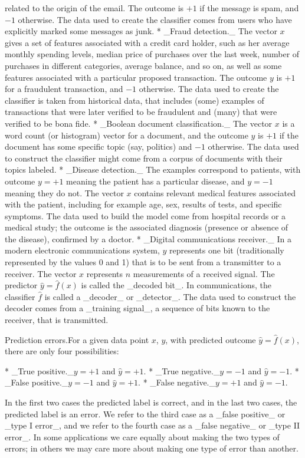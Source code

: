 related to the origin of the email. The outcome is \(+1\) if the message is spam, and \(-1\) otherwise. The data used to create the classifier comes from users who have explicitly marked some messages as junk.
* _Fraud detection._ The vector \(x\) gives a set of features associated with a credit card holder, such as her average monthly spending levels, median price of purchases over the last week, number of purchases in different categories, average balance, and so on, as well as some features associated with a particular proposed transaction. The outcome \(y\) is \(+1\) for a fraudulent transaction, and \(-1\) otherwise. The data used to create the classifier is taken from historical data, that includes (some) examples of transactions that were later verified to be fraudulent and (many) that were verified to be bona fide.
* _Boolean document classification._ The vector \(x\) is a word count (or histogram) vector for a document, and the outcome \(y\) is \(+1\) if the document has some specific topic (say, politics) and \(-1\) otherwise. The data used to construct the classifier might come from a corpus of documents with their topics labeled.
* _Disease detection._ The examples correspond to patients, with outcome \(y=+1\) meaning the patient has a particular disease, and \(y=-1\) meaning they do not. The vector \(x\) contains relevant medical features associated with the patient, including for example age, sex, results of tests, and specific symptoms. The data used to build the model come from hospital records or a medical study; the outcome is the associated diagnosis (presence or absence of the disease), confirmed by a doctor.
* _Digital communications receiver._ In a modern electronic communications system, \(y\) represents one bit (traditionally represented by the values 0 and 1) that is to be sent from a transmitter to a receiver. The vector \(x\) represents \(n\) measurements of a received signal. The predictor \(\hat{y}=\hat{f}(x)\) is called the _decoded bit_. In communications, the classifier \(\hat{f}\) is called a _decoder_ or _detector_. The data used to construct the decoder comes from a _training signal_, a sequence of bits known to the receiver, that is transmitted.

Prediction errors.For a given data point \(x\), \(y\), with predicted outcome \(\hat{y}=\hat{f}(x)\), there are only four possibilities:

* _True positive._\(y=+1\) and \(\hat{y}=+1\).
* _True negative._\(y=-1\) and \(\hat{y}=-1\).
* _False positive._\(y=-1\) and \(\hat{y}=+1\).
* _False negative._\(y=+1\) and \(\hat{y}=-1\).

In the first two cases the predicted label is correct, and in the last two cases, the predicted label is an error. We refer to the third case as a _false positive_ or _type I error_, and we refer to the fourth case as a _false negative_ or _type II error_. In some applications we care equally about making the two types of errors; in others we may care more about making one type of error than another.

 